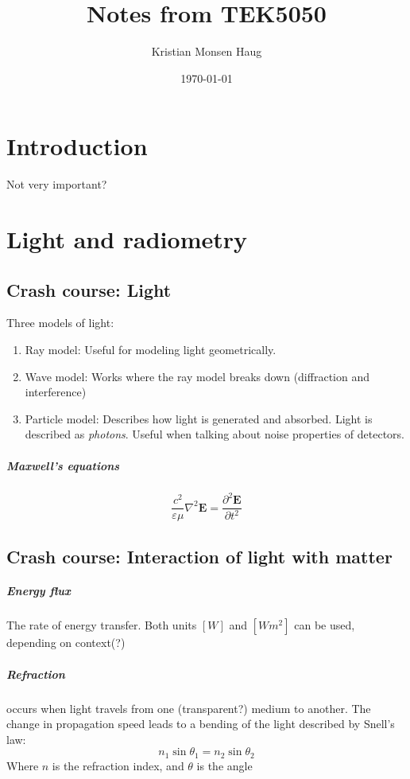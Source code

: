 \documentclass[article]{memoir}
\title{Notes from TEK5050}
\author{Kristian Monsen Haug}
\date{\today}
\begin{document}
\maketitle


\chapter{Introduction}

Not very important?

\chapter{Light and radiometry}
\section{Crash course: Light}

Three models of light:
\begin{enumerate}
    \item Ray model: Useful for modeling light geometrically.
    \item Wave model: Works where the ray model breaks down (diffraction and interference)
    \item Particle model: Describes how light is generated and absorbed. Light is described as \emph{photons}. Useful when talking about noise properties of detectors.
\end{enumerate}

\paragraph{Maxwell's equations}
\begin{equation}
    \frac{c^2}{\varepsilon \mu} \nabla^2 \mathbf{E} = \frac{\partial^2\mathbf{E}}{\partial t^2}    
\end{equation}

\section{Crash course: Interaction of light with matter}

\paragraph{Energy flux}
The rate of energy transfer. Both units \([W]\) and \([Wm^2]\) can be used, depending on context(?)

\paragraph{Refraction}
occurs when light travels from one (transparent?) medium to another. The change in propagation speed leads to a bending of the light described by Snell's law:
\begin{equation}
    n_1 \sin \theta_1 = n_2 \sin \theta_2
\end{equation}
Where \(n\) is the refraction index, and \(\theta\) is the angle
\end{document}
